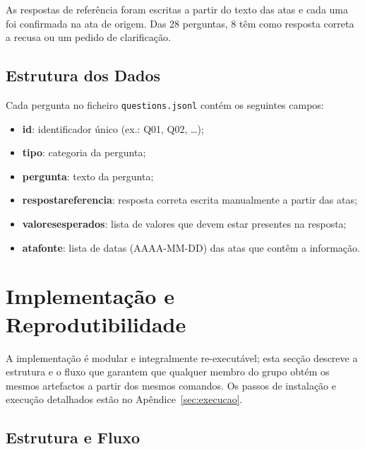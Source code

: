 \documentclass[11pt]{article}
\renewcommand{\_}{\textunderscore\allowbreak}
\begin{document}
As respostas de referência foram escritas a partir do texto das atas e cada uma foi confirmada na ata de origem. Das 28 perguntas, 8 têm como resposta correta a recusa ou um pedido de clarificação.

\subsection{Estrutura dos Dados}

Cada pergunta no ficheiro \texttt{questions.jsonl} contém os seguintes campos:
\begin{itemize}
    \item \textbf{id}: identificador único (ex.: Q01, Q02, \ldots);
    \item \textbf{tipo}: categoria da pergunta;
    \item \textbf{pergunta}: texto da pergunta;
    \item \textbf{resposta\_referencia}: resposta correta escrita manualmente a partir das atas;
    \item \textbf{valores\_esperados}: lista de valores que devem estar presentes na resposta;
    \item \textbf{ata\_fonte}: lista de datas (AAAA-MM-DD) das atas que contêm a informação.
\end{itemize}

\section{Implementação e Reprodutibilidade}
\label{sec:implementacao}

A implementação é modular e integralmente re-executável; esta secção descreve a estrutura e o fluxo que garantem que qualquer membro do grupo obtém os mesmos artefactos a partir dos mesmos comandos. Os passos de instalação e execução detalhados estão no Apêndice~\ref{sec:execucao}.

\subsection{Estrutura e Fluxo}
\end{document}
